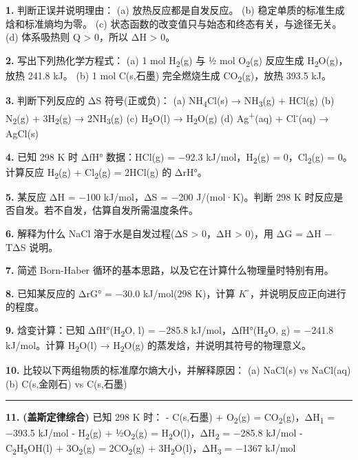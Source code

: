 \documentclass[a4paper,11pt]{ctexart}
\begin{document}
\textbf{1.} 判断正误并说明理由：
(a) 放热反应都是自发反应。
(b) 稳定单质的标准生成焓和标准熵均为零。
(c) 状态函数的改变值只与始态和终态有关，与途径无关。
(d) 体系吸热则 Q \textgreater{} 0，所以 ΔH \textgreater{} 0。

\textbf{2.} 写出下列热化学方程式：
(a) 1 mol H\textsubscript{2}(g) 与 ½ mol O\textsubscript{2}(g) 反应生成 H\textsubscript{2}O(g)，放热 241.8 kJ。
(b) 1 mol C(s,石墨) 完全燃烧生成 CO\textsubscript{2}(g)，放热 393.5 kJ。

\textbf{3.} 判断下列反应的 ΔS 符号(正或负)：
(a) NH\textsubscript{4}Cl(s) → NH\textsubscript{3}(g) + HCl(g)
(b) N\textsubscript{2}(g) + 3H\textsubscript{2}(g) → 2NH\textsubscript{3}(g)
(c) H\textsubscript{2}O(l) → H\textsubscript{2}O(g)
(d) Ag\textsuperscript{+}(aq) + Cl\textsuperscript{-}(aq) → AgCl(s)

\textbf{4.} 已知 298 K 时 ΔfH° 数据：HCl(g) = −92.3 kJ/mol，H\textsubscript{2}(g) = 0，Cl\textsubscript{2}(g) = 0。计算反应 H\textsubscript{2}(g) + Cl\textsubscript{2}(g) = 2HCl(g) 的 ΔrH°。

\textbf{5.} 某反应 ΔH = −100 kJ/mol，ΔS = −200 J/(mol·K)。判断 298 K 时反应是否自发。若不自发，估算自发所需温度条件。

\textbf{6.} 解释为什么 NaCl 溶于水是自发过程(ΔS \textgreater{} 0，ΔH \textgreater{} 0)，用 ΔG = ΔH − TΔS 说明。

\textbf{7.} 简述 Born-Haber 循环的基本思路，以及它在计算什么物理量时特别有用。

\textbf{8.} 已知某反应的 ΔrG° = −30.0 kJ/mol(298 K)，计算 \(K^{\circ}\)，并说明反应正向进行的程度。

\textbf{9.} 焓变计算：已知 ΔfH°(H\textsubscript{2}O, l) = −285.8 kJ/mol，ΔfH°(H\textsubscript{2}O, g) = −241.8 kJ/mol。计算 H\textsubscript{2}O(l) → H\textsubscript{2}O(g) 的蒸发焓，并说明其符号的物理意义。

\textbf{10.} 比较以下两组物质的标准摩尔熵大小，并解释原因：
(a) NaCl(s) vs NaCl(aq)
(b) C(s,金刚石) vs C(s,石墨)

\begin{center}\rule{0.5\linewidth}{0.5pt}\end{center}

\textbf{11.} \textbf{(盖斯定律综合)} 已知 298 K 时：
- C(s,石墨) + O\textsubscript{2}(g) = CO\textsubscript{2}(g)，ΔH\textsubscript{1} = −393.5 kJ/mol
- H\textsubscript{2}(g) + ½O\textsubscript{2}(g) = H\textsubscript{2}O(l)，ΔH\textsubscript{2} = −285.8 kJ/mol
- C\textsubscript{2}H\textsubscript{5}OH(l) + 3O\textsubscript{2}(g) = 2CO\textsubscript{2}(g) + 3H\textsubscript{2}O(l)，ΔH\textsubscript{3} = −1367 kJ/mol
\end{document}
